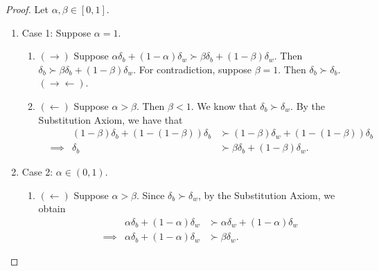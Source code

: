 \documentclass[12pt]{article}
\theoremstyle{definition}
\theoremstyle{remark}
\def\contra{\rightarrow \leftarrow}
\begin{document}
\begin{proof}
  Let $\alpha, \beta \in [0,1]$.
  \begin{enumerate}
    \item Case 1: Suppose $\alpha = 1$.
    \begin{enumerate}
      \item $(\rightarrow)$ Suppose $\alpha \delta_b + (1 - \alpha) \delta_w \succ \beta \delta_b + (1 - \beta) \delta_w$. Then $\delta_b \succ \beta \delta_b + (1 - \beta)\delta_w$. For contradiction, suppose $\beta = 1$. Then $\delta_b \succ \delta_b$. $(\contra)$.
      \item $(\leftarrow)$ Suppose $\alpha > \beta$. Then $\beta < 1$. We know that $\delta_b \succ \delta_w$. By the Substitution Axiom, we have that
      \begin{align*}
        &          & (1 - \beta)\delta_b + (1-(1-\beta))\delta_b &\succ (1 - \beta)\delta_w + (1-(1-\beta))\delta_b \\
        & \implies & \delta_b &\succ \beta \delta_b + (1 - \beta)\delta_w.
      \end{align*}
    \end{enumerate}
    \item Case 2: $\alpha \in (0,1)$.
    \begin{enumerate}
      \item $(\leftarrow)$ Suppose $\alpha > \beta$. Since $\delta_b \succ \delta_w$, by the Substitution Axiom, we obtain
      \begin{align*}
        &          & \alpha \delta_b + (1-\alpha)\delta_w &\succ \alpha \delta_w + (1 - \alpha)\delta_w \\
        & \implies & \alpha \delta_b + (1-\alpha)\delta_w &\succ \beta \delta_w.
      \end{align*}


\end{enumerate}
\end{enumerate}
\end{proof}
\end{document}
